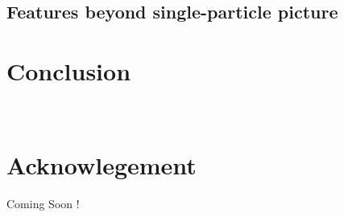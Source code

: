 \documentclass[%
reprint,
amsmath,amssymb,
aps,
]{revtex4-2}
\begin{document}
\subsection*{{\color{red} Features beyond single-particle picture}}

\section*{Conclusion}

~\\
%
\section*{Acknowlegement}
\begin{center}
    Coming Soon !
\end{center}


\end{document}
